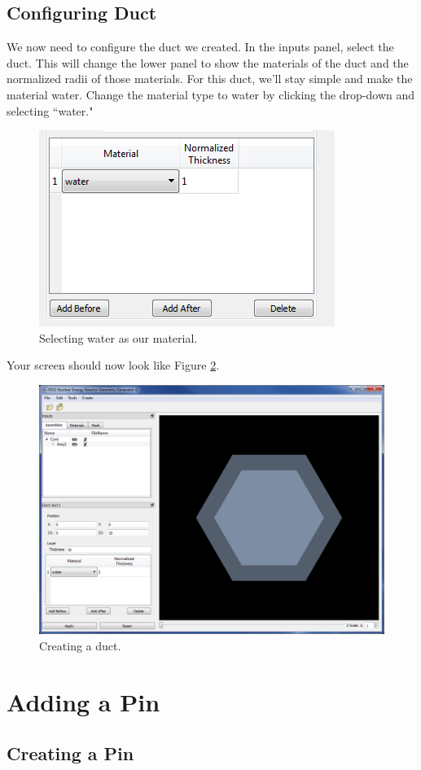 \subsection{Configuring Duct}

We now need to configure the duct we created.  In the inputs panel, select the duct.  This will change the lower panel to show the materials of the duct and the normalized radii of those materials.  For this duct, we'll stay simple and make the material water.  Change the material type to water by clicking the drop-down and selecting ``water."

\begin{figure}[H]
	\begin{center}
		\includegraphics[width=0.5\linewidth]{Images/hex-7.png}
		\caption{Selecting water as our material.}
		\label{fig:Hex7}
	\end{center}
\end{figure}

Your screen should now look like Figure \ref{fig:Hex8}.

\begin{figure}[H]
	\begin{center}
		\includegraphics[width=0.5\linewidth]{Images/hex-8.png}
		\caption{Creating a duct.}
		\label{fig:Hex8}
	\end{center}
\end{figure}

\section{Adding a Pin}
\subsection{Creating a Pin}

